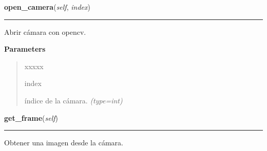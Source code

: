 \hspace{.8\funcindent}\begin{boxedminipage}{\funcwidth}

    \raggedright \textbf{open\_camera}(\textit{self}, \textit{index})

    \vspace{-1.5ex}

    \rule{\textwidth}{0.5\fboxrule}
\setlength{\parskip}{2ex}
Abrir cámara con opencv.

\setlength{\parskip}{1ex}
      \textbf{Parameters}
      \vspace{-1ex}

      \begin{quote}
        \begin{Ventry}{xxxxx}

          \item[index]


índice de la cámara.
            {\it (type=int)}

        \end{Ventry}

      \end{quote}

    \end{boxedminipage}

    \label{src:camera:Camera:get_frame}

    \vspace{0.5ex}

\hspace{.8\funcindent}\begin{boxedminipage}{\funcwidth}

    \raggedright \textbf{get\_frame}(\textit{self})

    \vspace{-1.5ex}

    \rule{\textwidth}{0.5\fboxrule}
\setlength{\parskip}{2ex}

Obtener una imagen desde la cámara.
\setlength{\parskip}{1ex}
    \end{boxedminipage}

    \label{src:camera:Camera:is_open}

    \vspace{0.5ex}

